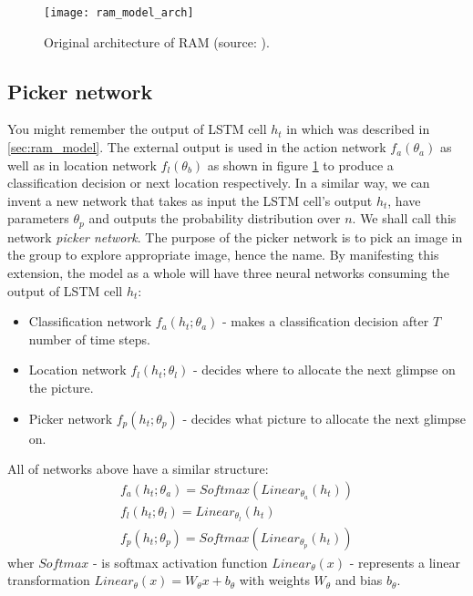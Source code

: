 \begin{figure}[h!]
	\texttt{[image: ram\_model\_arch]}
	\caption{Original architecture of RAM (source: \cite{DBLP:journals/corr/MnihHGK14}).}
	\label{fig:ram_model_arch}
\end{figure}

\subsection{Picker network}
\label{subs:picker_net}
You might remember the output of LSTM cell $h_t$ in \cite{DBLP:journals/corr/MnihHGK14}
which was described in \autoref{sec:ram_model}.
The external output is used
in the action network $f_a(\theta_a)$ as well as in location network $f_l(\theta_b)$
as shown in figure \ref{fig:ram_model_arch} to produce a classification decision or
next location respectively. In a similar way, we can invent a new network that takes as
input the LSTM cell's output $h_t$, have parameters $\theta_p$ and outputs
the probability distribution over $n$. We shall call this network
\emph{picker network}. The purpose of the picker network is to pick an image
in the group to explore appropriate image, hence the name. By manifesting
this extension, the model as a whole will have three neural networks consuming
the output of LSTM cell $h_t$:
\begin{itemize}
	\item Classification network $f_a(h_t; \theta_a)$ - makes a classification
		decision after $T$ number of time steps.
	\item Location network $f_l(h_t; \theta_l)$ - decides where to allocate the next glimpse
	on the picture.
	\item Picker network $f_p(h_t; \theta_p)$ - decides what picture to allocate the next glimpse on.
\end{itemize}

All of networks above have a similar structure:
\begin{align} \label{eq:picker_network}
	f_a(h_t; \theta_a) = Softmax(Linear_{\theta_a}(h_t)) \\
	f_l(h_t; \theta_l) = Linear_{\theta_l}(h_t) \\
	f_p(h_t; \theta_p) = Softmax(Linear_{\theta_p}(h_t))
\end{align}
wher $Softmax$ - is softmax activation function
$Linear_{\theta}(x)$ - represents
a linear transformation $Linear_{\theta}(x) = W_{\theta}x+b_{\theta}$ with weights
$W_{\theta}$ and bias $b_{\theta}$.


